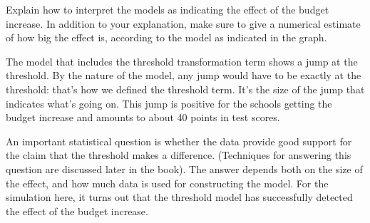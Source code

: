 Explain how to interpret the models as indicating the effect of the
budget increase.  In addition to your explanation, make sure to give a
numerical estimate of how big the effect is, according to the model as
indicated in the graph.
\TextEntry

\begin{AnswerText}
The model that includes the threshold transformation term shows a jump
at the threshold.  By the nature of the model, any jump would have to
be exactly at the threshold: that's how we defined the threshold
term.  It's the size of the jump that indicates what's going on.  This
jump is positive for the schools getting the budget increase and
amounts to about 40 points in test scores.
\end{AnswerText}

An important statistical question is whether the data provide good
support for the claim that the threshold makes a difference.  
(Techniques for answering this question are discussed later in the book).  The
answer depends both on the size of the effect, and how much data is
used for constructing the model.  For
the simulation here, it turns out that the threshold model has
successfully detected the effect of the budget increase.

